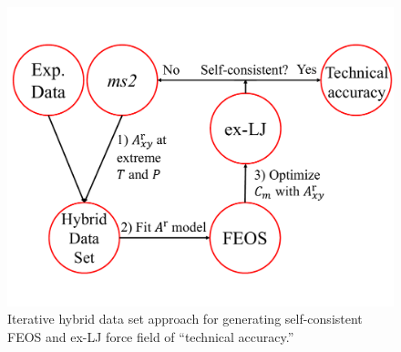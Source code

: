 \documentclass[12pt,a4paper]{article}
\begin{document}

\begin{figure}[htb!]
	\centering
	\includegraphics[width=4.5in]{FlowChart.pdf}
	\caption{Iterative hybrid data set approach for generating self-consistent FEOS and ex-LJ force field of ``technical accuracy.''}
	\label{FlowChart}
\end{figure}




\end{document}
